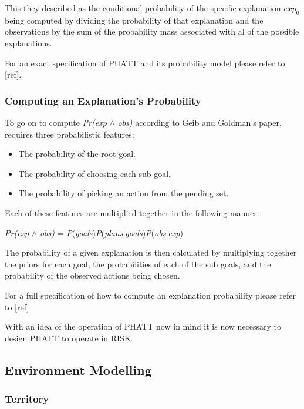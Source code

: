 \documentclass[parskip]{cs4rep}
\begin{document}
This they described as the conditional probability of the specific explanation $exp_0$ being computed by dividing the probability of that explanation and the observations by the sum of the probability mass associated with al of the possible explanations.

For an exact specification of PHATT and its probability model please refer to [ref].

\subsubsection{Computing an Explanation's Probability}

To go on to compute \textit{Pr(exp} $\wedge$ \textit{obs)} according to Geib and Goldman's paper, requires three probabilistic features:\newline

\begin{itemize}
\item
The probability of the root goal.
\item
The probability of choosing each sub goal.
\item
The probability of picking an action from the pending set.\newline
\end{itemize}

Each of these features are multiplied together in the following manner:\newline

\centerline{
\textit{Pr(exp} $\wedge$ \textit{obs)} = \textit{P}(\textit{goals})\textit{P}(\textit{plans}|\textit{goals})\textit{P}(\textit{obs}|\textit{exp})
}

The probability of a given explanation is then calculated by multiplying together the priors for each goal, the probabilities of each of the sub goals, and the probability of the observed actions being chosen.

For a full specification of how to compute an explanation probability please refer to [ref]

With an idea of the operation of PHATT now in mind it is now necessary to design PHATT to operate in RISK.

\subsection{Environment Modelling}

\subsubsection{Territory}
\end{document}
